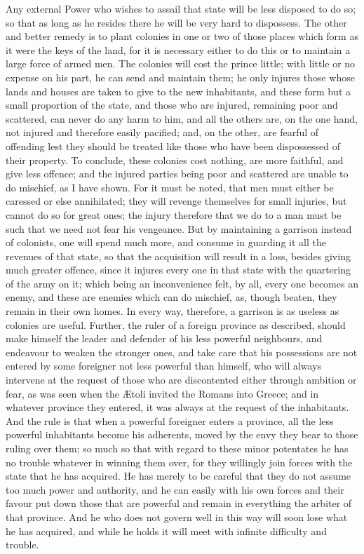 \documentclass[12pt,letterpaper]{memoir}
\begin{document}
Any external Power who wishes to assail that state will be less
disposed to do so; so that as long as he resides there he will be very
hard to dispossess. The other and better remedy is to plant colonies
in one or two of those places which form as it were the keys of the
land, for it is necessary either to do this or to maintain a large
force of armed men. The colonies will cost the prince little; with
little or no expense on his part, he can send and maintain them; he
only injures those whose lands and houses are taken to give to the new
inhabitants, and these form but a small proportion of the state, and
those who are injured, remaining poor and scattered, can never do any
harm to him, and all the others are, on the one hand, not injured and
therefore easily pacified; and, on the other, are fearful of offending
lest they should be treated like those who have been dispossessed of
their property. To conclude, these colonies cost nothing, are more
faithful, and give less offence; and the injured parties being poor
and scattered are unable to do mischief, as I have shown. For it must
be noted, that men must either be caressed or else annihilated; they
will revenge themselves for small injuries, but cannot do so for great
ones; the injury therefore that we do to a man must be such that we
need not fear his vengeance. But by maintaining a garrison instead of
colonists, one will spend much more, and consume in guarding it all
the revenues of that state, so that the acquisition will result in
a loss, besides giving much greater offence, since it injures every
one in that state with the quartering of the army on it; which being
an inconvenience felt, by all, every one becomes an enemy, and these
are enemies which can do mischief, as, though beaten, they remain in
their own homes. In every way, therefore, a garrison is as useless
as colonies are useful. Further, the ruler of a foreign province as
described, should make himself the leader and defender of his less
powerful neighbours, and endeavour to weaken the stronger ones, and
take care that his possessions are not entered by some foreigner not
less powerful than himself, who will always intervene at the request
of those who are discontented either through ambition or fear, as was
seen when the Ætoli invited the Romans into Greece; and in whatever
province they entered, it was always at the request of the inhabitants.
And the rule is that when a powerful foreigner enters a province, all
the less powerful inhabitants become his adherents, moved by the envy
they bear to those ruling over them; so much so that with regard to
these minor potentates he has no trouble whatever in winning them over,
for they willingly join forces with the state that he has acquired.
He has merely to be careful that they do not assume too much power
and authority, and he can easily with his own forces and their favour
put down those that are powerful and remain in everything the arbiter
of that province. And he who does not govern well in this way will
soon lose what he has acquired, and while he holds it will meet with
infinite difficulty and trouble.
\end{document}
